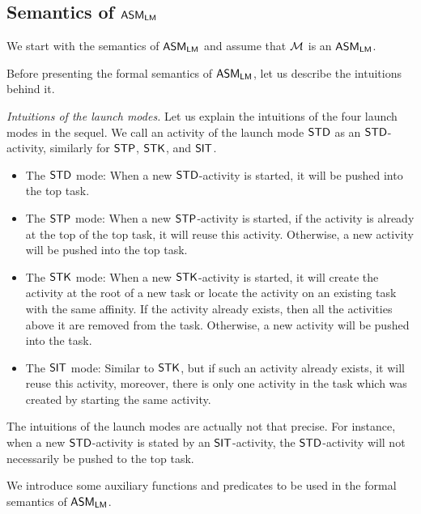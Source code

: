 \subsection{Semantics of $\textsf{ASM}_\textsf{LM}$}

We start with the semantics of $\textsf{ASM}_\textsf{LM}$ and assume that ${\mathcal{M} }$ is an $\textsf{ASM}_\textsf{LM}$. 

Before presenting the formal semantics of $\textsf{ASM}_\textsf{LM}$, let us describe the intuitions behind it.

%
\emph{Intuitions of the launch modes.}  Let us explain the intuitions of the four launch modes in the sequel. 
We call an activity of the launch mode $\mathsf{STD}$ as an $\mathsf{STD}$-activity, similarly for $\mathsf{STP}$, $\mathsf{STK}$, and $\mathsf{SIT}$. 
\begin{itemize}
\item The $\mathsf{STD}$ mode: When a new $\mathsf{STD}$-activity is started, it will be pushed into the top task. 
%
\item The $\mathsf{STP}$ mode: When a new $\mathsf{STP}$-activity is started, if the activity is already at the top of the top task, it will reuse this activity. Otherwise, a new activity will be pushed into the top task.
%
\item The $\mathsf{STK}$ mode: When a new $\mathsf{STK}$-activity is started, it will create the activity at the root of a new task or locate the activity on an existing task with the same affinity. If the activity already exists, then all the activities above it are removed from the task. Otherwise, a new activity will be pushed into the task.
%
\item The $\mathsf{SIT}$ mode: 
Similar to $\mathsf{STK}$, but if such an activity already exists, it will reuse this activity, moreover, there is only one activity in the task which was created by starting the same activity.
\end{itemize}

The intuitions of the launch modes are actually not that precise. For instance, when a new $\mathsf{STD}$-activity is stated by an $\mathsf{SIT}$-activity, the $\mathsf{STD}$-activity will not necessarily be pushed to the top task. 

We introduce some auxiliary functions and predicates to be used in the formal semantics of $\textsf{ASM}_\textsf{LM}$.

